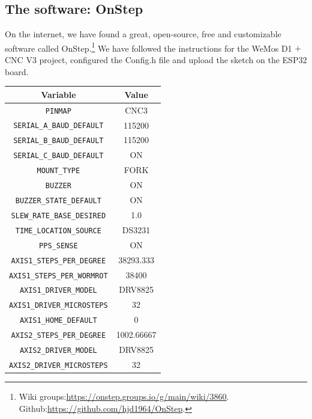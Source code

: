 \documentclass{article}
\begin{document}
\begin{multicols}{2}
        \section{The software: OnStep}
        On the internet, we have found a great, open-source, free and customizable software called OnStep.\footnote{Wiki groups:\url{https://onstep.groups.io/g/main/wiki/3860}.\\Github:\url{https://github.com/hjd1964/OnStep}.}
        We have followed the instructions for the WeMos D1 \(+\) CNC V3 project, configured the Config.h file and upload the sketch on the ESP32 board.
        \begin{minipage}
            {0.5\textwidth}
            \centering
            \begin{tabular}{cc}
                Variable & Value \\
                \hline
                \texttt{PINMAP} & CNC3\\
                \texttt{SERIAL\_A\_BAUD\_DEFAULT} & 115200 \\
                \texttt{SERIAL\_B\_BAUD\_DEFAULT} & 115200 \\
                \texttt{SERIAL\_C\_BAUD\_DEFAULT} &  ON \\
                \texttt{MOUNT\_TYPE} & FORK \\
                \texttt{BUZZER} & ON\\
                \texttt{BUZZER\_STATE\_DEFAULT} & ON\\
                \texttt{SLEW\_RATE\_BASE\_DESIRED} & 1.0\\
                \texttt{TIME\_LOCATION\_SOURCE} & DS3231 \\
                \texttt{PPS\_SENSE} & ON \\
                \texttt{AXIS1\_STEPS\_PER\_DEGREE} & 38293.333 \\
                \texttt{AXIS1\_STEPS\_PER\_WORMROT} & 38400\\ 
                \texttt{AXIS1\_DRIVER\_MODEL} & DRV8825\\
                \texttt{AXIS1\_DRIVER\_MICROSTEPS} & 32 \\
                \texttt{AXIS1\_HOME\_DEFAULT} & 0\\
                \texttt{AXIS2\_STEPS\_PER\_DEGREE} & 1002.66667 \\
                \texttt{AXIS2\_DRIVER\_MODEL} & DRV8825 \\
                \texttt{AXIS2\_DRIVER\_MICROSTEPS} & 32 \\

\end{tabular}
\end{minipage}
\end{multicols}
\end{document}
